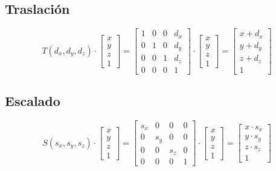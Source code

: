 \subsection{Traslación}
$$T(d_x, d_y, d_z) \cdot
	\left[\begin{matrix}
			x \\ y \\ z \\ 1
		\end{matrix}\right] =
	\left[\begin{matrix}
			1 & 0 & 0 & d_x \\ 0 & 1 & 0 & d_y \\ 0 & 0 & 1 & d_z \\ 0 & 0 & 0 & 1
		\end{matrix}\right] \cdot
	\left[\begin{matrix}
			x \\ y \\ z \\ 1
		\end{matrix}\right] =
	\left[\begin{matrix}
			x+ d_x \\ y+d_y \\ z+d_z \\ 1
		\end{matrix}\right]$$

\subsection{Escalado}
$$S(s_x, s_y, s_z) \cdot
	\left[\begin{matrix}
			x \\ y \\ z \\ 1
		\end{matrix}\right] =
	\left[\begin{matrix}
			s_x & 0 & 0 & 0 \\ 0 & s_y & 0 & 0 \\ 0 & 0 & s_z & 0 \\ 0 & 0 & 0 & 1
		\end{matrix}\right] \cdot
	\left[\begin{matrix}
			x \\ y \\ z \\ 1
		\end{matrix}\right] =
	\left[\begin{matrix}
			x\cdot s_x \\ y\cdot s_y \\ z\cdot s_z \\ 1
		\end{matrix}\right]$$

